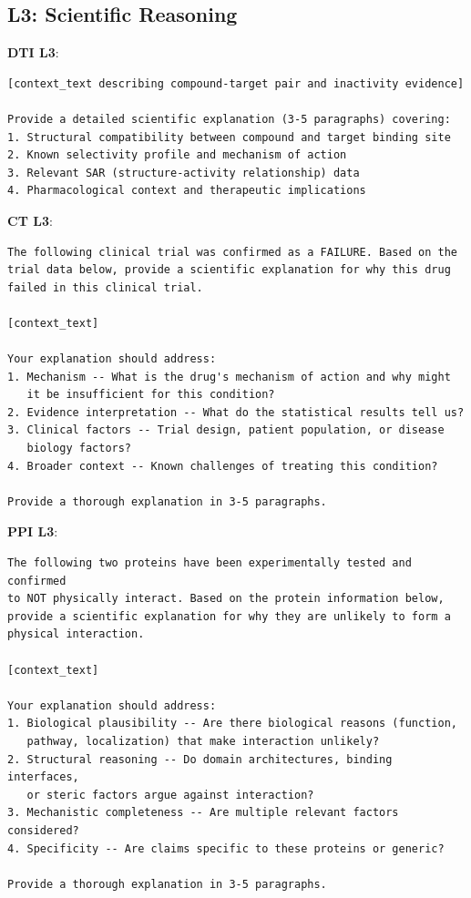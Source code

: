 \subsection{L3: Scientific Reasoning}

\textbf{DTI L3}:
\begin{small}
\begin{verbatim}
[context_text describing compound-target pair and inactivity evidence]

Provide a detailed scientific explanation (3-5 paragraphs) covering:
1. Structural compatibility between compound and target binding site
2. Known selectivity profile and mechanism of action
3. Relevant SAR (structure-activity relationship) data
4. Pharmacological context and therapeutic implications
\end{verbatim}
\end{small}

\textbf{CT L3}:
\begin{small}
\begin{verbatim}
The following clinical trial was confirmed as a FAILURE. Based on the
trial data below, provide a scientific explanation for why this drug
failed in this clinical trial.

[context_text]

Your explanation should address:
1. Mechanism -- What is the drug's mechanism of action and why might
   it be insufficient for this condition?
2. Evidence interpretation -- What do the statistical results tell us?
3. Clinical factors -- Trial design, patient population, or disease
   biology factors?
4. Broader context -- Known challenges of treating this condition?

Provide a thorough explanation in 3-5 paragraphs.
\end{verbatim}
\end{small}

\textbf{PPI L3}:
\begin{small}
\begin{verbatim}
The following two proteins have been experimentally tested and confirmed
to NOT physically interact. Based on the protein information below,
provide a scientific explanation for why they are unlikely to form a
physical interaction.

[context_text]

Your explanation should address:
1. Biological plausibility -- Are there biological reasons (function,
   pathway, localization) that make interaction unlikely?
2. Structural reasoning -- Do domain architectures, binding interfaces,
   or steric factors argue against interaction?
3. Mechanistic completeness -- Are multiple relevant factors considered?
4. Specificity -- Are claims specific to these proteins or generic?

Provide a thorough explanation in 3-5 paragraphs.
\end{verbatim}
\end{small}

